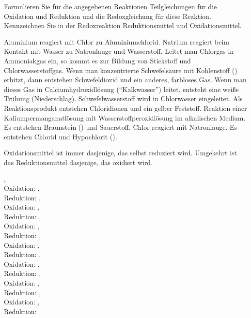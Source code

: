 \documentclass{scrartcl}
\begin{document}
\begin{question}
  Formulieren Sie für die angegebenen Reaktionen Teilgleichungen für die
  Oxidation und Reduktion und die Redoxgleichung für diese Reaktion.
  Kennzeichnen Sie in der Redoxreaktion Reduktionsmittel und Oxidationsmittel.
  \begin{tasks}
    \task Aluminium reagiert mit Chlor zu Aluminiumchlorid.
    \task Natrium reagiert beim Kontakt mit Wasser zu Natronlauge und Wasserstoff.
    \task Leitet man Chlorgas in Ammoniakgas ein, so kommt es zur Bildung von
      Stickstoff und Chlorwasserstoffgas.
    \task Wenn man konzentrierte Schwefelsäure mit Kohlenstoff () erhitzt, dann
      entstehen Schwefeldioxid und ein anderes, farbloses Gas. Wenn man dieses Gas in
      Calciumhydroxidlösung ("`Kalkwasser"') leitet, entsteht eine weiße Trübung
      (Niederschlag).
    \task Schwefelwasserstoff wird in Chlorwasser eingeleitet. Als Reaktionsprodukt
      entstehen Chloridionen und ein gelber Feststoff.
    \task Reaktion einer Kaliumpermanganatlösung mit Wasserstoffperoxidlösung im
      alkalischen Medium. Es entstehen Braunstein () und Sauerstoff.
    \task Chlor reagiert mit Natronlauge. Es entstehen Chlorid und Hypochlorit
      ().
  \end{tasks}
\end{question}
\begin{solution}
  Oxidationsmittel ist immer dasjenige, das selbst reduziert wird. Umgekehrt
  ist das Reduktionsmittel dasjenige, das oxidiert wird.
  \begin{tasks}
    \task {},\\
      Oxidation: ,\\
      Reduktion: 
    \task {},\\
      Oxidation: ,\\
      Reduktion: 
    \task {},\\
      Oxidation: ,\\
      Reduktion: 
    \task {},\\
      Oxidation: ,\\
      Reduktion: 
    \task {},\\
      Oxidation: ,\\
      Reduktion: 
    \task {},\\
      Oxidation: ,\\
      Reduktion: 
    \task {},\\
      Oxidation: ,\\
      Reduktion: 
  \end{tasks}
\end{solution}
\end{document}
